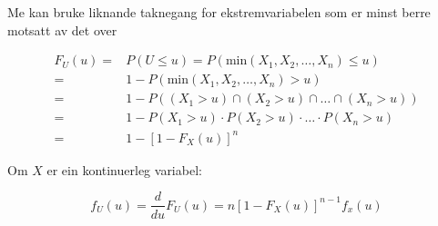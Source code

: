 Me kan bruke liknande taknegang for ekstremvariabelen som er minst berre motsatt av det over

\begin{equation}
\begin{aligned}
    F_U(u) = & P(U \leq u) = P(\text{min}(X_1, X_2, \dots, X_n) \leq u) \\
       = & 1 - P(\text{min}(X_1, X_2, \dots, X_n) > u) \\
       = & 1 - P((X_1 > u) \cap (X_2 > u) \cap \dots \cap (X_n > u)) \\
       = & 1 - P(X_1 > u) \cdot P(X_2 > u) \cdot \dots \cdot P(X_n > u) \\
       = & 1 - [1 - F_X(u)]^n
\end{aligned}
\end{equation}

Om $X$ er ein kontinuerleg variabel:

\begin{equation}
    f_U(u) = \frac{d}{du} F_U(u) = n[1 - F_X(u)]^{n-1}f_x(u)
\end{equation}